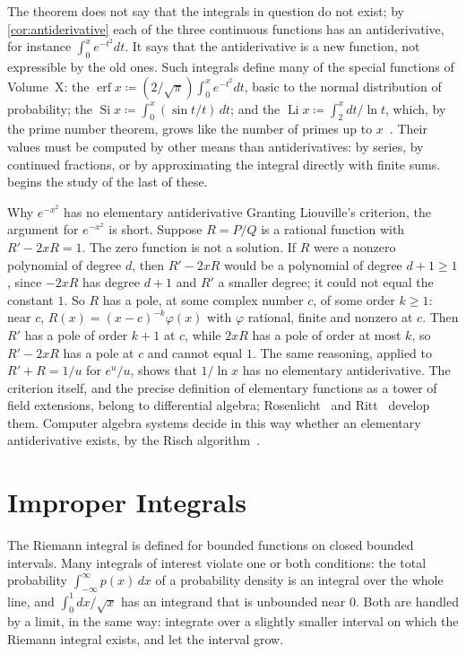 The theorem does not say that the integrals in question do not exist; by \cref{cor:antiderivative} each of the three continuous functions has an antiderivative, for instance $\int_0^xe^{-t^2}dt$. It says that the antiderivative is a new function, not expressible by the old ones. Such integrals define many of the special functions of Volume~X: the  $\operatorname{erf}x\coloneqq(2/\sqrt\pi)\int_0^xe^{-t^2}dt$, basic to the normal distribution of probability; the  $\operatorname{Si}x\coloneqq\int_0^x(\sin t/t)\,dt$; and the  $\operatorname{Li}x\coloneqq\int_2^xdt/\ln t$, which, by the prime number theorem, grows like the number of primes up to $x$~\cite{hardywright2008}. Their values must be computed by other means than antiderivatives: by series, by continued fractions, or by approximating the integral directly with finite sums.  begins the study of the last of these.

\begin{note}{Why $e^{-x^2}$ has no elementary antiderivative}
Granting Liouville's criterion, the argument for $e^{-x^2}$ is short. Suppose $R=P/Q$ is a rational function with $R'-2xR=1$. The zero function is not a solution. If $R$ were a nonzero polynomial of degree $d$, then $R'-2xR$ would be a polynomial of degree $d+1\ge1$, since $-2xR$ has degree $d+1$ and $R'$ a smaller degree; it could not equal the constant $1$. So $R$ has a pole, at some complex number $c$, of some order $k\ge1$: near $c$, $R(x)=(x-c)^{-k}\varphi(x)$ with $\varphi$ rational, finite and nonzero at $c$. Then $R'$ has a pole of order $k+1$ at $c$, while $2xR$ has a pole of order at most $k$, so $R'-2xR$ has a pole at $c$ and cannot equal $1$. The same reasoning, applied to $R'+R=1/u$ for $e^u/u$, shows that $1/\ln x$ has no elementary antiderivative. The criterion itself, and the precise definition of elementary functions as a tower of field extensions, belong to differential algebra; Rosenlicht~\cite{rosenlicht1972} and Ritt~\cite{ritt1948} develop them. Computer algebra systems decide in this way whether an elementary antiderivative exists, by the Risch algorithm~\cite{bronstein2005}.
\end{note}

\section{Improper Integrals}
\label{sec:improper}

The Riemann integral is defined for bounded functions on closed bounded intervals. Many integrals of interest violate one or both conditions: the total probability $\int_{-\infty}^\infty p(x)\,dx$ of a probability density is an integral over the whole line, and $\int_0^1dx/\sqrt x$ has an integrand that is unbounded near $0$. Both are handled by a limit, in the same way: integrate over a slightly smaller interval on which the Riemann integral exists, and let the interval grow.

